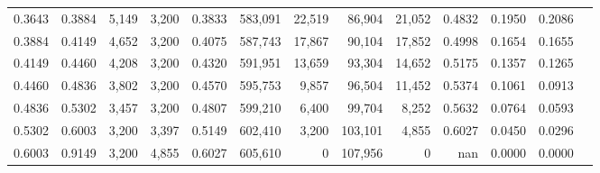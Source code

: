 \begin{tabular}{rrrrrrrrrrrrr}
0.3643 & 0.3884 &  5,149 & 3,200 &                                     0.3833 & 583,091 &  22,519 &  86,904 &  21,052 & 0.4832 & 0.1950 & 0.2086 \\
0.3884 & 0.4149 &  4,652 & 3,200 &                                     0.4075 & 587,743 &  17,867 &  90,104 &  17,852 & 0.4998 & 0.1654 & 0.1655 \\
0.4149 & 0.4460 &  4,208 & 3,200 &                                     0.4320 & 591,951 &  13,659 &  93,304 &  14,652 & 0.5175 & 0.1357 & 0.1265 \\
0.4460 & 0.4836 &  3,802 & 3,200 &                                     0.4570 & 595,753 &   9,857 &  96,504 &  11,452 & 0.5374 & 0.1061 & 0.0913 \\
0.4836 & 0.5302 &  3,457 & 3,200 &                                     0.4807 & 599,210 &   6,400 &  99,704 &   8,252 & 0.5632 & 0.0764 & 0.0593 \\
0.5302 & 0.6003 &  3,200 & 3,397 &                                     0.5149 & 602,410 &   3,200 & 103,101 &   4,855 & 0.6027 & 0.0450 & 0.0296 \\
0.6003 & 0.9149 &  3,200 & 4,855 &                                     0.6027 & 605,610 &       0 & 107,956 &       0 &    nan & 0.0000 & 0.0000 \\
\bottomrule
\end{tabular}
